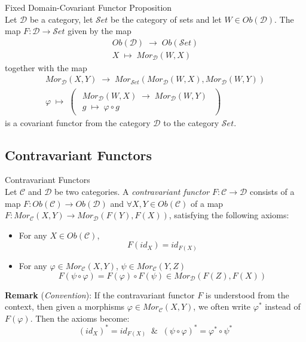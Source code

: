 \begin{proposition}{Fixed Domain-Covariant Functor Proposition}\\
Let $\mathcal{D}$ be a category, let $\mathcal{S}et$ be the category of sets and let $W \in Ob(\mathcal{D})$. The map $F: \mathcal{D} \to \mathcal{S}et$ given by the map
$$\substack{Ob(\mathcal{D}) \; \to \; Ob(\mathcal{S}et)\\
X \; \mapsto \; Mor_\mathcal{D} (W,X)}$$
together with the map
$$\substack{Mor_\mathcal{D} (X,Y) \; \to \; Mor_{\mathcal{S}et} (Mor_\mathcal{D} (W,X), Mor_\mathcal{D} (W,Y)) \\
\varphi \; \mapsto \; \begin{pmatrix}
    \substack{Mor_\mathcal{D} (W,X) \; \to\; Mor_\mathcal{D} (W,Y)\\
    g \; \mapsto \; \varphi \circ g}
\end{pmatrix} }$$
is a covariant functor from the category $\mathcal{D}$ to the category $\mathcal{S}et$.
\end{proposition}

\subsection{Contravariant Functors}

\begin{definition}{Contravariant Functors}\\
Let $\mathcal{C}$ and $\mathcal{D}$ be two categories. A \textit{contravariant functor} $F: \mathcal{C} \to \mathcal{D}$ consists of a map $F: Ob(\mathcal{C}) \to Ob(\mathcal{D})$ and $\forall X,Y \in Ob(\mathcal{C})$ of a map $F: Mor_\mathcal{C}(X,Y) \to Mor_\mathcal{D} (F(Y) , F(X))$, satisfying the following axioms:
\begin{itemize}
    \item For any $X \in Ob(\mathcal{C})$,
    $$F(id_X) = id_{F(X)}$$
    \item For any $\varphi \in Mor_\mathcal{C} (X,Y)$, $\psi \in Mor_\mathcal{C}(Y,Z)$
    $$F(\psi \circ \varphi) = F(\varphi) \circ F(\psi) \in Mor_\mathcal{D} (F(Z), F(X))$$
\end{itemize}
\end{definition}

\noindent\textbf{Remark} (\textit{Convention}): If the contravariant functor $F$ is understood from the context, then given a morphisms $\varphi \in Mor_\mathcal{C} (X,Y)$, we often write $\varphi^*$ instead of $F(\varphi)$. Then the axioms become:
$$(id_X)^* = id_{F(X)} \;\;\&\;\; (\psi \circ \varphi)^* = \varphi^* \circ \psi^* $$

